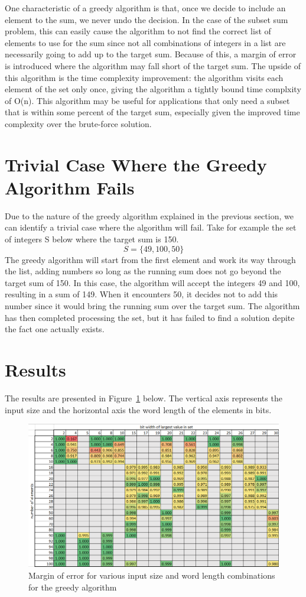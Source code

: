 \documentclass{report}
\begin{document}
One characteristic of a greedy algorithm is that, once we decide to include an element
to the sum, we never undo the decision. In the case of the subset sum problem, this
can easily cause the algorithm to not find the correct list of elements to use for the sum
since not all combinations of integers in a list are necessarily going to add up to
the target sum. Because of this, a margin of error is introduced where the algorithm
may fall short of the target sum. The upside of this algorithm is the time complexity
improvement: the algorithm visits each element of the set only once, giving the
algorithm a tightly bound time complxity of O(n). This algorithm may be useful for
applications that only need a subset that is within some percent of the target sum,
especially given the improved time complexity over the brute-force solution.

\section{Trivial Case Where the Greedy Algorithm Fails}
Due to the nature of the greedy algorithm explained in the previous section,
we can identify a trivial case where the algorithm will fail. Take for example
the set of integers S below where the target sum is 150.
$$S = \{49, 100, 50\}$$
The greedy algorithm will start from the first element and work its way through
the list, adding numbers so long as the running sum does not go beyond the target sum of 150.
In this case, the algorithm will accept the integers 49 and 100, resulting in a sum of 149.
When it encounters 50, it decides not to add this number since it would bring the running
sum over the target sum. The algorithm has then completed processing the set, but it
has failed to find a solution depite the fact one actually exists.

\section{Results}

The results are presented in Figure~\ref{fig:greedy} below. The vertical axis represents the
input size and the horizontal axis the word length of the elements in bits.

\begin{figure}[h]
\centering
\includegraphics[width=12cm]{P3_margin.png}
\caption{Margin of error for various input size and word length combinations for the greedy algorithm}
\label{fig:greedy}
\end{figure}
\end{document}
